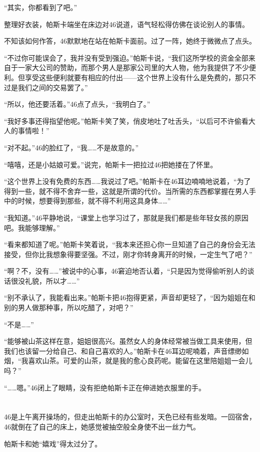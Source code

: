 “其实，你都看到了吧。”

整理好衣装，帕斯卡端坐在床边对46说道，语气轻松得仿佛在谈论别人的事情。

不知该如何作答，46默默地在站在帕斯卡面前。过了一阵，她终于微微点了点头。

“不过你可能误会了，我并没有受到强迫。”帕斯卡说，“我们这所学校的资金全部来自于一家大公司的赞助，而那个男人是那家公司里的大人物，他为我提供了不少便利。但享受这些便利就要有相应的付出——这个世界上没有什么是免费的，那只不过是我们之间的交易罢了。”

“所以，他还要活着。”46点了点头，“我明白了。”

“我好多事还得指望他呢。”帕斯卡笑了笑，俏皮地吐了吐舌头，“以后可不许偷看大人的事情啦！”

“对不起。”46的脸红了，“我……不是故意的。”

“嘻嘻，还是小姑娘可爱。”说完，帕斯卡一把拉过46把她搂在了怀里。

“这个世界上没有免费的东西……我说过了吧。”帕斯卡在46耳边喃喃地说着，“为了得到一些，就不得不舍弃一些，这就是所谓的代价。当所需的东西都掌握在男人手中的时候，想要得到那些，就不得不利用这具身体……”

“我知道。”46平静地说，“课堂上也学习过了，那就是我们都是些年轻女孩的原因吧。我能够理解。”

“看来都知道了呢。”帕斯卡笑着说，“我本来还担心你一旦知道了自己的身份会无法接受，但你比我想象得要坚强。不过，刚才你转身离开的时候，一定生气了吧？”

“啊？不，没有……”被说中的心事，46窘迫地否认着，“只是因为觉得偷听别人的谈话很没礼貌，所以才……”

“别不承认了，我能看出来。”帕斯卡把46抱得更紧，声音却更轻了，“因为姐姐在和别的男人做那种事，所以吃醋了，对吧？”

“不是……”

“能够被山茶这样在意，姐姐很高兴。虽然女人的身体经常被当做工具来使用，但我们也该留一分给自己、和自己喜欢的人。”帕斯卡在46耳边呢喃着，声音缥缈如烟，“我喜欢山茶。可爱的山茶，就是我的愈心良药呢。能留在这里陪姐姐一会儿吗？”

“……嗯。”46闭上了眼睛，没有拒绝帕斯卡正在伸进她衣服里的手。

\section*{}

46是上午离开操场的，但走出帕斯卡的办公室时，天色已经有些发暗。一回宿舍，46就倒在了自己的床上，她感觉被抽空般全身使不出一丝力气。

帕斯卡和她“嬉戏”得太过分了。

